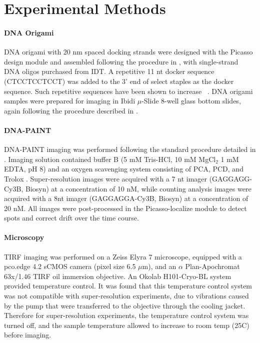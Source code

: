\section{Experimental Methods} \label{exp_methods}


\paragraph{DNA Origami}
DNA origami with 20 nm spaced docking strands were designed with the Picasso design module \cite{schnitzbauer_2017}
and assembled following the procedure in \cite{schnitzbauer_2017}, with single-strand DNA oligos purchased from IDT.
  A repetitive 11 nt docker sequence (CTCCTCCTCCT) was added to the 3' end of select staples as the docker sequence.
  Such repetitive sequences have been shown to increase \pon~\citep{civitci_2020}.
  DNA origami samples were prepared for imaging in Ibidi $\mu$-Slide 8-well glass bottom slides, 
  again following the procedure described in \cite{schnitzbauer_2017}. 
  
\paragraph{DNA-PAINT}
DNA-PAINT imaging was performed following the standard procedure detailed in \cite{schnitzbauer_2017}. 
  Imaging solution contained buffer B (5 mM Tris-HCl, 10 mM MgCl$_2$ 1 mM EDTA, pH 8) and an oxygen 
  scavenging system consisting of PCA, PCD, and Trolox \cite{schnitzbauer_2017}.
  Super-resolution images were acquired with a 7 nt imager (GAGGAGG-Cy3B, Biosyn) at a concentration of 10 nM,
  while counting analysis images were acquired with a 8nt imager (GAGGAGGA-Cy3B, Biosyn) at a concentration of 20 nM.
  All images were post-processed in the Picasso-localize module to detect spots and correct drift over the time course. 

\paragraph{Microscopy}

TIRF imaging was performed on a Zeiss Elyra 7 microscope, equipped with 
a pco.edge 4.2 sCMOS camera (pixel size 6.5 $\mu$m), and an $\alpha$ 
Plan-Apochromat 63x/1.46 TIRF oil immersion objective.
  An Okolab H101-Cryo-BL system provided temperature control. 
  It was found that this temperature control system was not compatible with super-resolution experiments, 
  due to vibrations caused by the pump that were transferred to the objective through the cooling jacket.
  Therefore for super-resolution experiments, the temperature control system was turned off, 
  and the sample temperature allowed to increase to room temp (25\textdegree C) before imaging.